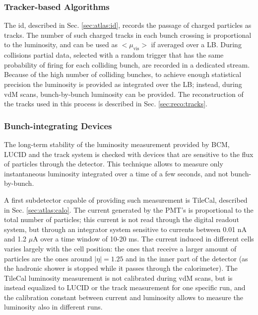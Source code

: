 
\subsubsection*{Tracker-based Algorithms}

The \gls{id}, described in Sec. \ref{sec:atlas:id}, records the passage of charged particles as tracks. The number of such charged tracks in each bunch crossing is proportional to the luminosity, and can be used as $<\mu_\mathrm{vis}>$ if averaged over a LB. 
During collisions partial data, selected with a random trigger that has the same probability of firing for each colliding bunch, are recorded in a dedicated stream. Because of the high number of colliding bunches, to achieve enough statistical precision the luminosity is provided as integrated over the LB; instead, during vdM scans, bunch-by-bunch luminosity can be provided. 
The reconstruction of the tracks used in this process is described in Sec. \ref{sec:reco:tracks}.

\subsubsection*{Bunch-integrating Devices}

The long-term stability of the luminosity measurement provided by BCM, LUCID and the track system is checked with devices that are sensitive to the flux of particles through the detector. This technique allows to measure only instantaneous luminosity integrated over a time of a few seconds, and not bunch-by-bunch.

A first subdetector capable of providing such measurement is TileCal, described in Sec. \ref{sec:atlas:calo}. The current generated by the PMT's is proportional to the total number of particles; this current is not read through the digital readout system, but through an integrator system sensitive to currents between 0.01 nA and 1.2 $\mu$A over a time window of 10-20 ms. The current induced in different cells varies largely with the cell position: the ones that receive a larger amount of particles are the ones around $|\eta|=1.25$ and in the inner part of the detector (as the hadronic shower is stopped while it passes through the calorimeter). The TileCal luminosity measurement is not calibrated during vdM scans, but is instead equalized to LUCID or the track measurement for one specific run, and the calibration constant between current and luminosity allows to measure the luminosity also in different runs.

